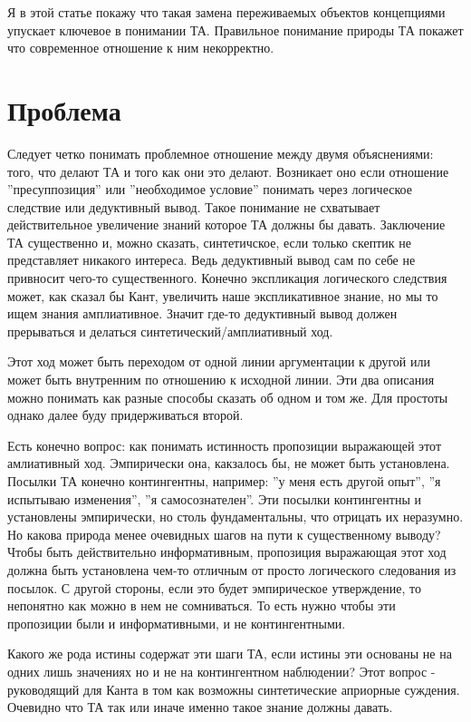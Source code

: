 \documentclass{article}
\begin{document}
Я в этой статье покажу что такая замена переживаемых объектов концепциями упускает ключевое в понимании ТА. Правильное понимание природы ТА покажет что современное отношение к ним некорректно.

\section{Проблема}

Следует четко понимать проблемное отношение между двумя объяснениями: того, что делают ТА и того как они это делают. Возникает оно если отношение ''пресуппозиция'' или ''необходимое условие'' понимать через логическое следствие или дедуктивный вывод. Такое понимание не схватывает действительное увеличение знаний которое ТА должны бы давать. Заключение ТА существенно и, можно сказать, синтетичское, если только скептик не представляет никакого интереса. Ведь дедуктивный вывод сам по себе не привносит чего-то существенного. Конечно экспликация логического следствия может, как сказал бы Кант, увеличить наше экспликативное знание, но мы то ищем знания амплиативное. Значит где-то дедуктивный вывод должен прерываться и делаться синтетический/амплиативный ход.

Этот ход может быть переходом от одной линии аргументации к другой или может быть внутренним по отношению к исходной линии. Эти два описания можно понимать как разные способы сказать об одном и том же. Для простоты однако далее буду придерживаться второй.

Есть конечно вопрос: как понимать истинность пропозиции выражающей этот амлиативный ход. Эмпирически она, какзалось бы, не может быть установлена. Посылки ТА конечно контингентны, например: ''у меня есть другой опыт'', ''я испытываю изменения'', ''я самосознателен''. Эти посылки контингентны и установлены эмпирически, но столь фундаментальны, что отрицать их неразумно. Но какова природа менее очевидных шагов на пути к существенному выводу? Чтобы быть действительно информативным, пропозиция выражающая этот ход должна быть установлена чем-то отличным от просто логического следования из посылок. С другой стороны, если это будет эмпирическое утверждение, то непонятно как можно в нем не сомниваться. То есть нужно чтобы эти пропозиции были и информативными, и не контингентными.

Какого же рода истины содержат эти шаги ТА, если истины эти основаны не на одних лишь значениях но и не на контингентном наблюдении? Этот вопрос - руководящий для Канта в том как возможны синтетические априорные суждения. Очевидно что ТА так или иначе именно такое знание должны давать.
\end{document}
